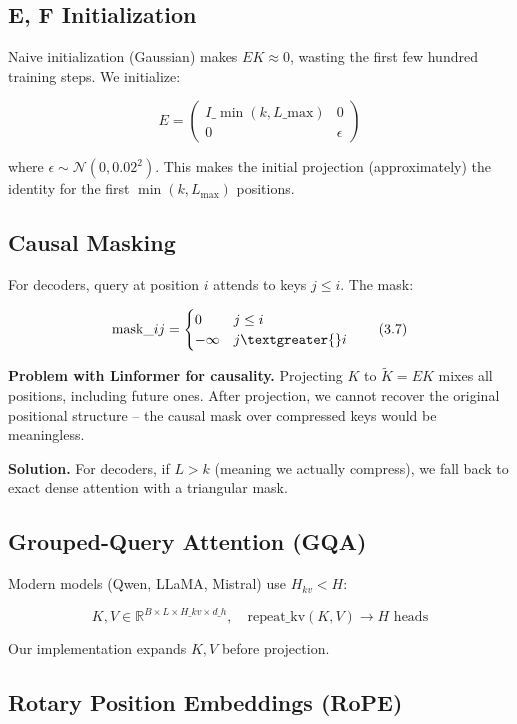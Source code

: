 \subsection{E, F Initialization}

Naive initialization (Gaussian) makes $E K \approx 0$, wasting the first 
few hundred training steps. We initialize:

\[
E = \begin{pmatrix} I\_{\min(k, L\_\text{max})} & 0 \\ 0 & \epsilon \end{pmatrix}
\tag{3.6}
\]

where $\epsilon \sim \mathcal{N}(0, 0.02^2)$. This makes the initial 
projection (approximately) the identity for the first $\min(k, L_\text{max})$ 
positions.

\subsection{Causal Masking}

For decoders, query at position $i$ attends to keys $j \leq i$. The mask:

\[
\text{mask}\_{ij} = \begin{cases} 0 & j \leq i \\ -\infty & j \textgreater{} i \end{cases}
\tag{3.7}
\]

\textbf{Problem with Linformer for causality.} Projecting $K$ to $\tilde{K} = E K$ 
mixes all positions, including future ones. After projection, we cannot 
recover the original positional structure -- the causal mask over compressed 
keys would be meaningless.

\textbf{Solution.} For decoders, if $L > k$ (meaning we actually compress), we 
fall back to exact dense attention with a triangular mask.

\subsection{Grouped-Query Attention (GQA)}

Modern models (Qwen, LLaMA, Mistral) use $H_{kv} < H$:

\[
K, V \in \mathbb{R}^{B \times L \times H\_{kv} \times d\_h}, \quad
\text{repeat\_kv}(K, V) \to H \text{ heads}
\tag{3.8}
\]

Our implementation expands $K, V$ before projection.

\subsection{Rotary Position Embeddings (RoPE)}

